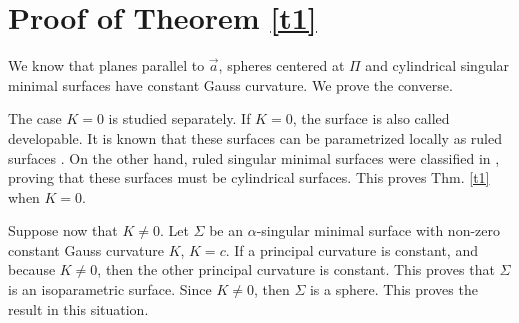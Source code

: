 \documentclass{birkjour}
\theoremstyle{definition}
\theoremstyle{remark}
\numberwithin{equation}{section}
\begin{document}
\section{Proof of Theorem \ref{t1}}\label{s3}
We know that planes parallel to $\vec{a}$,  spheres centered at $\Pi$ and   cylindrical singular minimal surfaces have  constant Gauss curvature. We prove  the converse. 

The case $K=0$ is studied separately. If $K=0$, the surface is also called developable. It is known that these surfaces can be parametrized locally as ruled surfaces \cite{hn}. On the other hand, ruled singular minimal surfaces were classified in \cite{ay}, proving that these surfaces must be cylindrical surfaces. This proves Thm. \ref{t1} when $K=0$.


Suppose now that $K\not=0$. Let $\Sigma$ be an $\alpha$-singular minimal surface with non-zero constant Gauss curvature $K$, $K=c$. If a principal curvature is constant, and because $K\not=0$, then the other principal curvature is constant. This proves that $\Sigma$ is an isoparametric surface. Since $K\not=0$, then $\Sigma$ is a sphere. This proves the result in this situation. 
\end{document}
